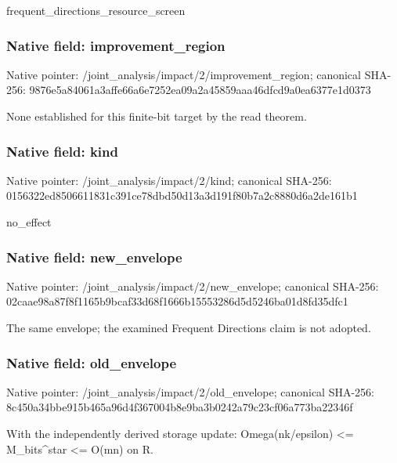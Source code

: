 \documentclass[10pt,a4paper]{article}
\begin{document}
\begingroup\raggedright\sloppy frequent\_\allowbreak{}directions\_\allowbreak{}resource\_\allowbreak{}screen\par\endgroup

\subsubsection{Native field: improvement\_\allowbreak{}region}
Native pointer: /joint\_\allowbreak{}analysis/impact/2/improvement\_\allowbreak{}region; canonical SHA-256: 9876e5a84061a3affe66a6e7252ea09a2a45859aaa46dfcd9a0ea6377e1d0373

\begingroup\raggedright\sloppy None established for this finite-bit target by the read theorem.\par\endgroup

\subsubsection{Native field: kind}
Native pointer: /joint\_\allowbreak{}analysis/impact/2/kind; canonical SHA-256: 0156322ed8506611831c391ce78dbd50d13a3d191f80b7a2c8880d6a2de161b1

\begingroup\raggedright\sloppy no\_\allowbreak{}effect\par\endgroup

\subsubsection{Native field: new\_\allowbreak{}envelope}
Native pointer: /joint\_\allowbreak{}analysis/impact/2/new\_\allowbreak{}envelope; canonical SHA-256: 02caae98a87f8f1165b9bcaf33d68f1666b15553286d5d5246ba01d8fd35dfc1

\begingroup\raggedright\sloppy The same envelope;\allowbreak{} the examined Frequent Directions claim is not adopted.\par\endgroup

\subsubsection{Native field: old\_\allowbreak{}envelope}
Native pointer: /joint\_\allowbreak{}analysis/impact/2/old\_\allowbreak{}envelope; canonical SHA-256: 8c450a34bbe915b465a96d4f367004b8e9ba3b0242a79c23cf06a773ba22346f

\begingroup\raggedright\sloppy With the independently derived storage update:\allowbreak{} Omega(nk/\allowbreak{}epsilon) <=\allowbreak{} M\_\allowbreak{}bits\textasciicircum{}star <=\allowbreak{} O(mn) on R.\par\endgroup
\end{document}
